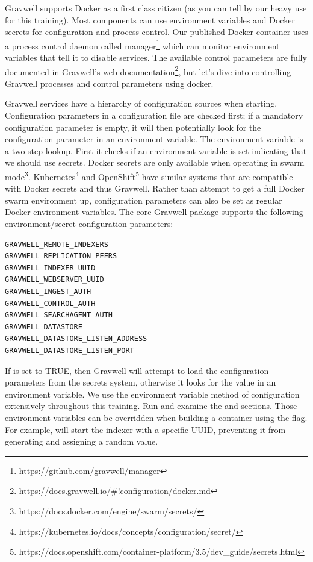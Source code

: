 {Gravwell supports Docker as a first class citizen (as you can tell by
our heavy use for this training). Most components can use environment
variables and Docker secrets for configuration and process control. Our
published Docker container uses a process control daemon called
manager\footnote{https://github.com/gravwell/manager} which
can monitor environment variables that tell it to disable services. The
available control parameters are fully documented in
Gravwell's web documentation\footnote{https://docs.gravwell.io/\#!configuration/docker.md},
but let's dive into controlling Gravwell processes and control
parameters using docker.

Gravwell services have a hierarchy of configuration sources when
starting. Configuration parameters in a configuration file are checked
first; if a mandatory configuration parameter is empty, it will then
potentially look for the configuration parameter in an environment
variable. The environment variable is a two step lookup. First it
checks if an environment variable is set indicating that we should use
secrets. Docker secrets are only available when operating in swarm
mode\footnote{https://docs.docker.com/engine/swarm/secrets/}.
Kubernetes\footnote{https://kubernetes.io/docs/concepts/configuration/secret/} and
OpenShift\footnote{https://docs.openshift.com/container-platform/3.5/dev\_guide/secrets.html} have
similar systems that are compatible with Docker secrets and thus
Gravwell. Rather than attempt to get a full Docker swarm environment
up, configuration parameters can also be set as regular Docker
environment variables. The core Gravwell package supports the following
environment/secret configuration parameters:

\begin{Verbatim}[breaklines=true]
GRAVWELL_REMOTE_INDEXERS
GRAVWELL_REPLICATION_PEERS
GRAVWELL_INDEXER_UUID
GRAVWELL_WEBSERVER_UUID
GRAVWELL_INGEST_AUTH
GRAVWELL_CONTROL_AUTH
GRAVWELL_SEARCHAGENT_AUTH
GRAVWELL_DATASTORE
GRAVWELL_DATASTORE_LISTEN_ADDRESS
GRAVWELL_DATASTORE_LISTEN_PORT
\end{Verbatim}

If  is set to TRUE, then Gravwell
will attempt to load the configuration parameters from the secrets
system, otherwise it looks for the value in an environment variable. We
use the environment variable method of configuration extensively
throughout this training. Run  and
examine the  and  sections. Those environment
variables can be overridden when building a container using
the  flag. For example,  will start the indexer with a specific UUID, preventing
it from generating and assigning a random value.

}
